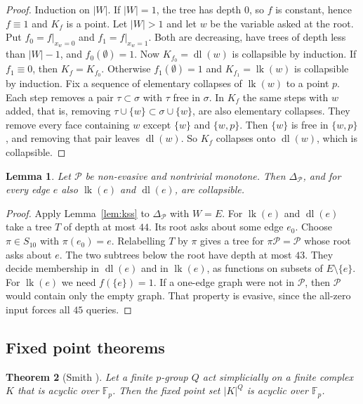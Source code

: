 \documentclass[11pt]{article}
\theoremstyle{plain}
\newtheorem{theorem}{Theorem}[section]
\newtheorem{lemma}[theorem]{Lemma}
\theoremstyle{definition}
\theoremstyle{remark}
\newcommand{\PP}{\mathcal P}
\newcommand{\Del}{\Delta_{\mathcal P}}
\newcommand{\lk}{\operatorname{lk}}
\newcommand{\dl}{\operatorname{dl}}
\newcommand{\F}{\mathbb F}
\begin{document}
\begin{proof}
Induction on $|W|$.
If $|W|=1$, the tree has depth $0$, so $f$ is constant, hence $f\equiv1$ and $K_f$ is a point.
Let $|W|>1$ and let $w$ be the variable asked at the root.
Put $f_0=f|_{x_w=0}$ and $f_1=f|_{x_w=1}$.
Both are decreasing, have trees of depth less than $|W|-1$, and $f_0(\emptyset)=1$.
Now $K_{f_0}=\dl(w)$ is collapsible by induction.
If $f_1\equiv0$, then $K_f=K_{f_0}$.
Otherwise $f_1(\emptyset)=1$ and $K_{f_1}=\lk(w)$ is collapsible by induction.
Fix a sequence of elementary collapses of $\lk(w)$ to a point $p$.
Each step removes a pair $\tau\subset\sigma$ with $\tau$ free in $\sigma$.
In $K_f$ the same steps with $w$ added, that is, removing $\tau\cup\{w\}\subset\sigma\cup\{w\}$, are also elementary collapses.
They remove every face containing $w$ except $\{w\}$ and $\{w,p\}$.
Then $\{w\}$ is free in $\{w,p\}$, and removing that pair leaves $\dl(w)$.
So $K_f$ collapses onto $\dl(w)$, which is collapsible.
\end{proof}

\begin{lemma}\label{lem:linkdel}
Let $\PP$ be non-evasive and nontrivial monotone.
Then $\Del$, and for every edge $e$ also $\lk(e)$ and $\dl(e)$, are collapsible.
\end{lemma}

\begin{proof}
Apply Lemma~\ref{lem:kss} to $\Del$ with $W=E$.
For $\lk(e)$ and $\dl(e)$ take a tree $T$ of depth at most $44$.
Its root asks about some edge $e_0$.
Choose $\pi\in S_{10}$ with $\pi(e_0)=e$.
Relabelling $T$ by $\pi$ gives a tree for $\pi\PP=\PP$ whose root asks about $e$.
The two subtrees below the root have depth at most $43$.
They decide membership in $\dl(e)$ and in $\lk(e)$, as functions on subsets of $E\setminus\{e\}$.
For $\lk(e)$ we need $f(\{e\})=1$.
If a one-edge graph were not in $\PP$, then $\PP$ would contain only the empty graph.
That property is evasive, since the all-zero input forces all $45$ queries.
\end{proof}

\subsection{Fixed point theorems}

\begin{theorem}[Smith \cite{Smi}]\label{thm:smith}
Let a finite $p$-group $Q$ act simplicially on a finite complex $K$ that is acyclic over $\F_p$.
Then the fixed point set $|K|^Q$ is acyclic over $\F_p$.
\end{theorem}
\end{document}
